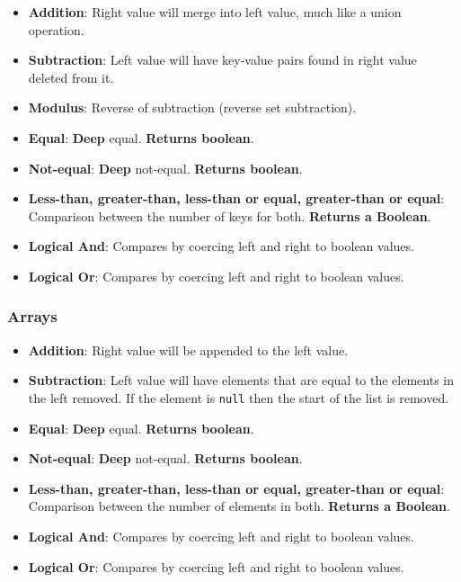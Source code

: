 \documentclass[12pt, letterpaper]{article}
\begin{document}
\begin{itemize}
    \item \textbf{Addition}: Right value will merge into left value, much like a union operation.
    \item \textbf{Subtraction}: Left value will have key-value pairs found in right value deleted from it.
    \item \textbf{Modulus}: Reverse of subtraction (reverse set subtraction).
    \item \textbf{Equal}: \textbf{Deep} equal. \textbf{Returns boolean}.
    \item \textbf{Not-equal}: \textbf{Deep} not-equal. \textbf{Returns boolean}.
    \item \textbf{Less-than, greater-than, less-than or equal, greater-than or equal}: Comparison between the number of keys for both. \textbf{Returns a Boolean}.
    \item \textbf{Logical And}: Compares by coercing left and right to boolean values.
    \item \textbf{Logical Or}: Compares by coercing left and right to boolean values.
\end{itemize}

\subsubsection{Arrays}

\begin{itemize}
    \item \textbf{Addition}: Right value will be appended to the left value.
    \item \textbf{Subtraction}: Left value will have elements that are equal to the elements in the left removed. If the element is \verb|null| then the start of the list is removed.
    \item \textbf{Equal}: \textbf{Deep} equal. \textbf{Returns boolean}.
    \item \textbf{Not-equal}: \textbf{Deep} not-equal. \textbf{Returns boolean}.
    \item \textbf{Less-than, greater-than, less-than or equal, greater-than or equal}: Comparison between the number of elements in both. \textbf{Returns a Boolean}.
    \item \textbf{Logical And}: Compares by coercing left and right to boolean values.
    \item \textbf{Logical Or}: Compares by coercing left and right to boolean values.
\end{itemize}
\end{document}
